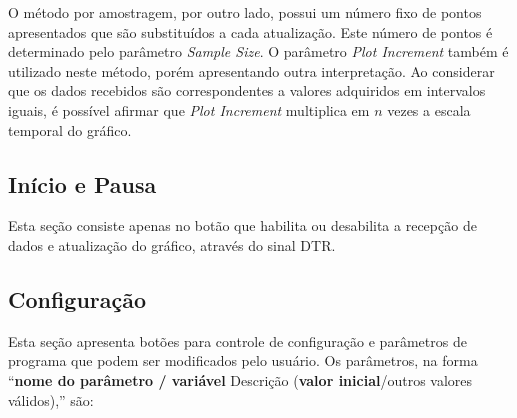 			O método por amostragem, por outro lado, possui um número fixo de pontos apresentados que são substituídos a cada atualização. Este número de pontos é determinado pelo parâmetro \textit{Sample Size}. O parâmetro \textit{Plot Increment} também é utilizado neste método, porém apresentando outra interpretação. Ao considerar que os dados recebidos são correspondentes a valores adquiridos em intervalos iguais, é possível afirmar que \textit{Plot Increment} multiplica em $n$ vezes a escala temporal do gráfico.



		\subsection{Início e Pausa}\label{sec:swpc:gui:start}

			Esta seção consiste apenas no botão que habilita ou desabilita a recepção de dados e atualização do gráfico, através do sinal DTR.

		\subsection{Configuração}\label{sec:swpc:gui:config}

			Esta seção apresenta botões para controle de configuração e parâmetros de programa que podem ser modificados pelo usuário. Os parâmetros, na forma ``\textbf{nome do parâmetro / variável} Descrição (\textbf{valor inicial}/outros valores válidos),'' são:

